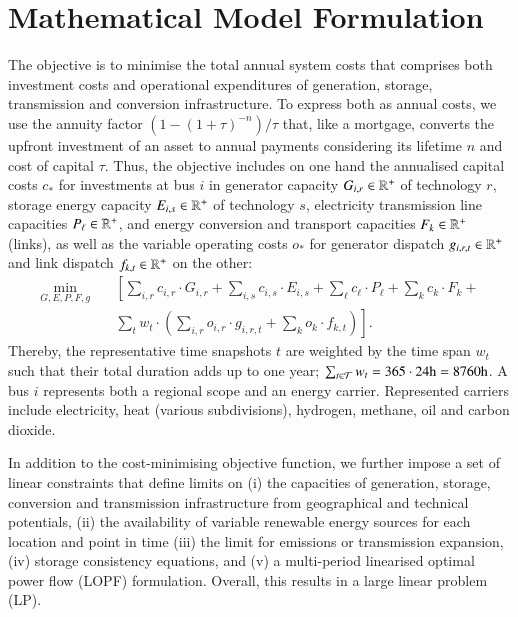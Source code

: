 \section{Mathematical Model Formulation}
\label{sec:si:math}

The objective is to minimise the total annual system costs that comprises both investment
costs and operational expenditures of generation, storage, transmission and
conversion infrastructure. To express both as annual costs, we use the annuity
factor $(1-(1+\tau)^{-n}) / \tau$ that, like a mortgage, converts the upfront
investment of an asset to annual payments considering its lifetime $n$ and cost
of capital $\tau$. Thus, the objective includes on one hand the annualised
capital costs $c_*$ for investments at bus $i$ in generator capacity
$G_{i,r}\in\mathbb{R}^+$ of technology $r$, storage energy capacity $E_{i,s}\in\mathbb{R}^+$ of
technology $s$, electricity transmission line capacities $P_{\ell}\in\mathbb{R}^+$, and
energy conversion and transport capacities $F_k\in\mathbb{R}^+$ (links), as well as the variable
operating costs $o_*$ for generator dispatch $g_{i,r,t}\in\mathbb{R}^+$ and link dispatch $f_{k,t}\in\mathbb{R}^+$ on the other:
\begin{align}
  \label{eq:objective}
  \min_{G,E,P,F,g} \quad &\left[\sum_{i,r} c_{i,r}\cdot G_{i,r} + \sum_{i,s} c_{i,s}\cdot E_{i,s} + \sum_{\ell}c_{\ell}\cdot P_{\ell}+ \sum_{k}c_{k}\cdot F_k +\right. \\
  & \left.  \sum_{t} w_t \cdot \left( \sum_{i,r} o_{i,r} \cdot g_{i,r,t} + \sum_k o_k \cdot f_{k,t} \right) \right].
\end{align}
Thereby, the representative time snapshots $t$ are weighted by the time span
$w_t$ such that their total duration adds up to one year; \mbox{$\sum_{t\in \mathcal{T}}
w_t=365\cdot 24\text{h}=8760\text{h}$}. A bus $i$ represents both a regional
scope and an energy carrier. Represented carriers include electricity, heat
(various subdivisions), hydrogen, methane, oil and carbon dioxide.


In addition to the cost-minimising objective function, we further impose a set
of linear constraints that define limits on (i) the capacities of generation,
storage, conversion and transmission infrastructure from geographical and
technical potentials, (ii) the availability of variable renewable energy sources
for each location and point in time (iii) the limit for \co emissions or transmission expansion, (iv)
storage consistency equations, and (v) a multi-period linearised optimal power
flow (LOPF) formulation. Overall, this results in a large linear problem (LP).

